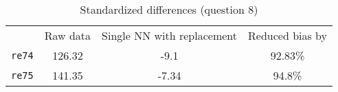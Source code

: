 \begin{table}[h!]
\caption{Standardized differences (question 8)}
	\label{q8}
\begin{center}
\begin{tabular}{rccc}
\toprule
& Raw data & Single NN with replacement & Reduced bias by \\
\addlinespace
\hline
\addlinespace
\texttt{re74} & 126.32 & -9.1 & 92.83\% \\ \addlinespace
\texttt{re75} & 141.35 & -7.34 & 94.8\% \\
\bottomrule
\end{tabular}
\end{center}
\end{table}
